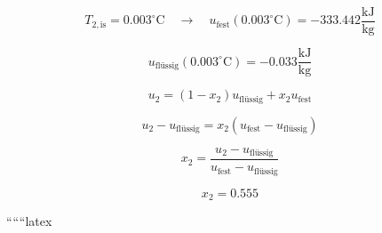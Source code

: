 \begin{equation*}
T_{2, \text{is}} = 0.003^\circ \text{C} \quad \rightarrow \quad u_{\text{fest}} (0.003^\circ \text{C}) = -333.442 \frac{\text{kJ}}{\text{kg}}
\end{equation*}

\begin{equation*}
u_{\text{flüssig}} (0.003^\circ \text{C}) = -0.033 \frac{\text{kJ}}{\text{kg}}
\end{equation*}

\begin{equation*}
u_2 = (1 - x_2) u_{\text{flüssig}} + x_2 u_{\text{fest}}
\end{equation*}

\begin{equation*}
u_2 - u_{\text{flüssig}} = x_2 (u_{\text{fest}} - u_{\text{flüssig}})
\end{equation*}

\begin{equation*}
x_2 = \frac{u_2 - u_{\text{flüssig}}}{u_{\text{fest}} - u_{\text{flüssig}}}
\end{equation*}

\begin{equation*}
x_2 = 0.555
\end{equation*}

``````latex



